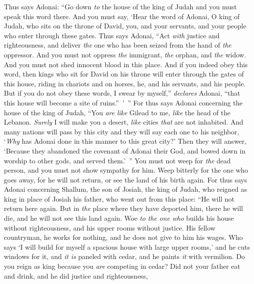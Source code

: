 \begin{biblechapter} %
\verse Thus says Adonai: “Go down \textit{to} the house of the king of Judah and you must speak this word there.
\verse And you must say, ‘Hear the word of Adonai, O king of Judah, who sits on the throne of David, you, and your servants, and your people who enter through these gates.
\verse Thus says Adonai, “Act \textit{with} justice and righteousness, and deliver \textit{the} one who has been seized from the hand of \textit{the} oppressor. And you must not oppress \textit{the} immigrant, \textit{the} orphan, and \textit{the} widow. And you must not shed innocent blood in this place.
\verse And if you indeed obey this word, then kings who sit for David on his throne will enter through the gates of this house, riding in chariots and on horses, he, and his servants, and his people.
\verse But if you do not obey these words, I swear by myself,” \textit{declares} Adonai, “that this house will become a site of ruins.” ’ ”
\verse For thus says Adonai concerning the house of the king of Judah,
\verse “You \textit{are like} Gilead to me, 
\textit{like} the head of the Lebanon. 
\textit{Surely} I will make you a desert, 
\textit{like} cities \textit{that} are not inhabited.
\verse And many nations will pass by this city and they will say each one to his neighbor, ‘\textit{Why} has Adonai done in this manner to this great city?’
\verse Then they will answer, ‘Because they abandoned the covenant of Adonai their God, and bowed down in worship to other gods, and served them.’ ”
\verse You must not weep for \textit{the} dead person, 
and you must not show sympathy for him. 
Weep bitterly for the one who goes away, 
for he will not return, or see the land of his birth again.
\verse For thus says Adonai concerning Shallum, the son of Josiah, the king of Judah, who reigned as king in place of Josiah his father, who went out from this place: “He will not return here again.
\verse But in \textit{the} place where they have deported him, there he will die, and he will not see this land again.
\verse Woe \textit{to the one who} builds his house without righteousness, 
and his upper rooms without justice. 
His fellow countryman, he works for nothing, 
and he does not give to him his wages.
\verse Who says ‘I will build for myself 
a spacious house with large upper rooms,’ 
and he cuts windows for it, 
and \textit{it is} paneled with cedar, 
and he paints \textit{it} with vermilion.
\verse Do you reign as king because you \textit{are} competing in cedar? 
Did not your father eat and drink, 
and he did justice and righteousness, 

\end{biblechapter}
